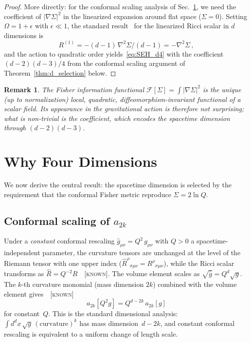 \documentclass[prd,twocolumn,superscriptaddress,longbibliography]{revtex4-2}
\newtheorem*{remark}{Remark}
\newcommand{\known}{\textsc{[known]}}
\begin{document}
\begin{proof}
More directly: for the conformal scaling analysis of
Sec.~\ref{sec:d4}, we need the coefficient of $|\nabla\Sigma|^2$
in the linearized expansion around flat space ($\Sigma = 0$).
Setting $\Omega = 1 + \epsilon$ with $\epsilon\ll 1$, the
standard result~\cite{Wald1984} for the linearized Ricci
scalar in $d$ dimensions is
\begin{equation}
  R^{(1)} = -(d-1)\,\nabla^2\Sigma/(d-1) = -\nabla^2\Sigma\,,
\end{equation}
and the action to quadratic order
yields~\eqref{eq:SEH_d4} with the coefficient
$(d-2)(d-3)/4$ from the conformal scaling argument
of Theorem~\ref{thm:d_selection} below.
\end{proof}

\begin{remark}
The Fisher information functional
$\mathcal{F}[\Sigma]=\int|\nabla\Sigma|^2$ is the unique
(up to normalization) local, quadratic, diffeomorphism-invariant
functional of a scalar field.
Its appearance in the gravitational action is therefore
not surprising; what is non-trivial is the \emph{coefficient},
which encodes the spacetime dimension through $(d-2)(d-3)$.
\end{remark}


\section{Why Four Dimensions}
\label{sec:d4}

We now derive the central result: the spacetime dimension
is selected by the requirement that the conformal Fisher
metric reproduce $\Sigma = 2\ln Q$.

\subsection{Conformal scaling of $a_{2k}$}

Under a \emph{constant} conformal rescaling
$\hat{g}_{\mu\nu}=Q^2\,g_{\mu\nu}$ with $Q>0$ a
spacetime-independent parameter, the curvature tensors are
unchanged at the level of the Riemann tensor with one
upper index ($\hat{R}^\rho{}_{\sigma\mu\nu}
= R^\rho{}_{\sigma\mu\nu}$), while the Ricci
scalar transforms as
$\hat{R}=Q^{-2}R$~\cite{Wald1984}~\known.
The volume element scales as
$\sqrt{\hat{g}} = Q^d\sqrt{g}$.
The $k$-th curvature monomial (mass dimension $2k$)
combined with the volume element
gives~\cite{Vassilevich2003,Gilkey1995}~\known
\begin{equation}\label{eq:a2k_scaling}
  \boxed{\;
  a_{2k}[Q^2 g]
  = Q^{d-2k}\, a_{2k}[g]
  \;}
\end{equation}
for constant~$Q$.
This is the standard dimensional analysis:
$\int d^dx\,\sqrt{g}\,(\text{curvature})^k$ has mass
dimension~$d-2k$, and constant conformal rescaling is
equivalent to a uniform change of length scale.
\end{document}

